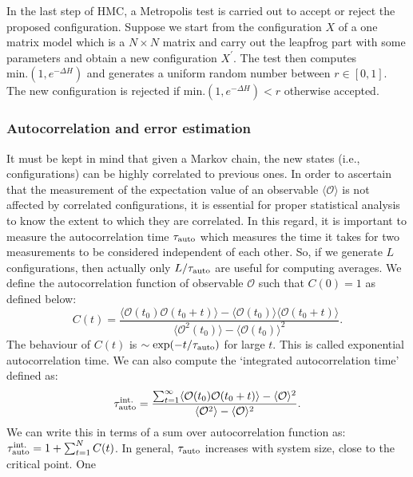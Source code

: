 \documentclass[letter,11pt]{article}
\begin{document}
\vspace{4mm} 
In the last step of HMC, a Metropolis test is carried out to accept or reject the proposed
configuration. Suppose we start from the configuration $X$ of a one matrix model 
which is a $N \times N$ matrix and carry out the leapfrog part with some parameters and obtain a new configuration 
$X^{\prime}$. The test then computes \texttt{$\text{min.}(1, e^{-\Delta H})$} and generates 
a uniform random number between $r \in [0,1]$. The new configuration is 
rejected if \texttt{$\text{min.}(1, e^{-\Delta H}) < r$} otherwise accepted. 
\subsubsection{\label{sec:autocorr}Autocorrelation and error estimation} 
It must be kept in mind that given a Markov chain, the new states 
(i.e., configurations) can be highly correlated to previous ones. 
In order to ascertain that the measurement of the expectation value of an observable $\langle \mathcal{O} \rangle$ is not affected by correlated configurations, it is essential for proper statistical analysis to know the extent to which they are correlated. In this regard, it is important to measure
the autocorrelation time $ \tau_{\rm{auto}}$ which measures the time it takes for two measurements to be considered independent of each other. So, if we generate $L$ configurations, then actually only $L/\tau_{\rm{auto}}$ are useful for computing averages.
We define the autocorrelation function of observable $\mathcal{O}$ such that
$C(0) = 1$ as defined below:
 \begin{equation}
 	C(t) = \frac{\langle \mathcal{O}(t_0) \mathcal{O}(t_0 + t) \rangle - \langle \mathcal{O}(t_0)\rangle \langle \mathcal{O}(t_0 + t) \rangle}{\langle \mathcal{O}^2(t_0)\rangle - \langle \mathcal{O}(t_0)\rangle^{2}}.
 \end{equation}
The behaviour of $C(t)$ is $\sim \exp(-t/\tau_{\rm{auto}})$ for large $t$. This is called exponential autocorrelation time. We can also compute the `integrated autocorrelation time' defined as:
\begin{equation}
	\tau_{\rm{auto}}^{\rm{int.}} = \frac{\sum_{t=1}^{\infty} \langle \mathcal{O}(t_0) \mathcal{O}(t_0 + t) \rangle - \langle \mathcal{O} \rangle^2 }{\langle \mathcal{O}^2\rangle - \langle \mathcal{O}\rangle^{2}}.
\end{equation}
We can write this in terms of a sum over autocorrelation function as: $\tau_{\rm{auto}}^{\rm{int.}} = 1 + \sum_{t=1}^{N} C(t)$. In general, $ \tau_{\rm{auto}}$ increases with system size, close to the critical point. One 
\end{document}
